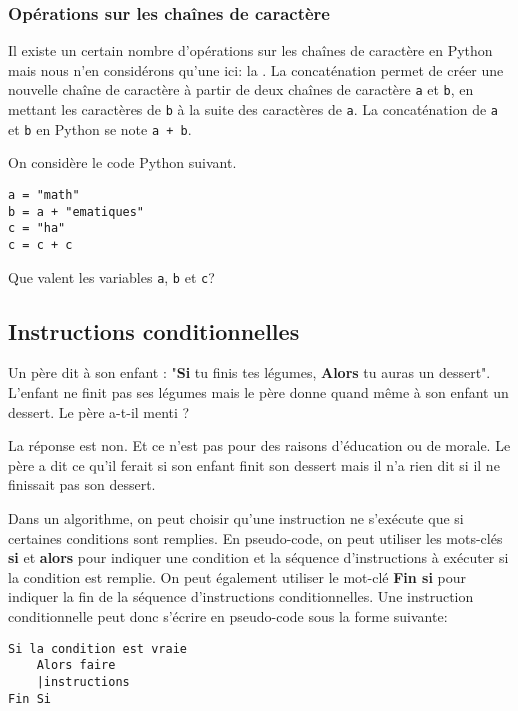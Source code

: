 \subsubsection{Opérations sur les chaînes de caractère}

Il existe un certain nombre d'opérations sur les chaînes de caractère en Python mais nous n'en considérons qu'une ici: la . La concaténation permet de créer une nouvelle chaîne de caractère à partir de deux chaînes de caractère \texttt{a} et \texttt{b}, en mettant les caractères de \texttt{b} à la suite des caractères de \texttt{a}. La concaténation de \texttt{a} et \texttt{b} en Python se note \texttt{a + b}.

\newpage

\begin{exercise}
	On considère le code Python suivant.
\begin{center}
	\begin{varwidth}[t]{.5\textwidth}
		\begin{lstlisting}[language=iPython,linewidth = 6cm]
a = "math"
b = a + "ematiques"
c = "ha"
c = c + c
\end{lstlisting}\end{varwidth}\end{center}
Que valent les variables \texttt{a}, \texttt{b} et \texttt{c}?
\end{exercise}

\subsection{Instructions conditionnelles}

\begin{remark}
	Un père dit à son enfant : "\textbf{Si} tu finis tes légumes, \textbf{Alors} tu auras un dessert". L'enfant ne finit pas ses légumes mais le père donne quand même à son enfant un dessert. Le père a-t-il menti ?
\end{remark}


La réponse est non. Et ce n'est pas pour des raisons d'éducation ou de morale. Le père a dit ce qu'il ferait si son enfant finit son dessert mais il n'a rien dit si il ne finissait pas son dessert.


Dans un algorithme, on peut choisir qu'une instruction ne s'exécute que si certaines conditions sont remplies. En pseudo-code, on peut utiliser les mots-clés {\ttfamily\bf{si}} et {\ttfamily\bf{alors}} pour indiquer une condition et la séquence d'instructions à exécuter si la condition est remplie. On peut également utiliser le mot-clé {\ttfamily\bf{Fin si}} pour indiquer la fin de la séquence d'instructions conditionnelles. Une instruction conditionnelle peut donc s'écrire en pseudo-code sous la forme suivante:
\begin{center}
	\begin{varwidth}[t]{.5\textwidth}
		\begin{lstlisting}[language=Pseudo,linewidth = 7cm]
Si la condition est vraie
    Alors faire
    |instructions
Fin Si
\end{lstlisting}\end{varwidth}\end{center}

